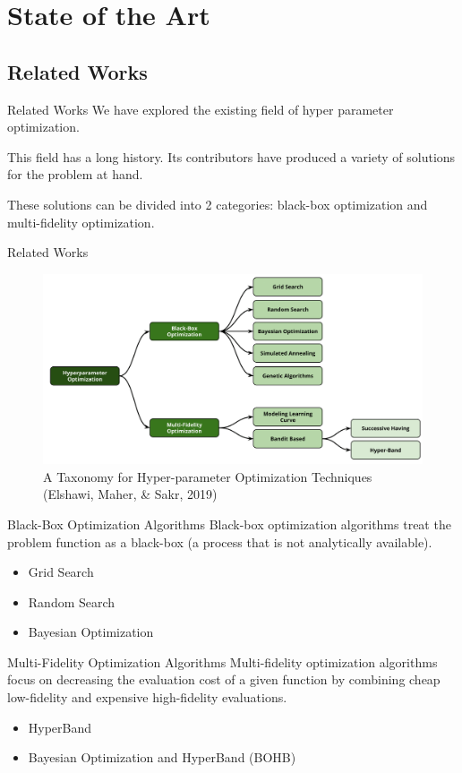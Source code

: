 \documentclass[10pt]{beamer}
\begin{document}
  \section{State of the Art}
  \subsection{Related Works}
  \begin{frame}{Related Works}
    We have explored the existing field of hyper parameter optimization. 

    This field has a long history. Its contributors have produced a variety of solutions for the problem at hand. 

    These solutions can be divided into 2 categories: black-box optimization and multi-fidelity optimization.
  \end{frame}
  \begin{frame}{Related Works}
    \begin{figure}
          \centering
          \includegraphics[width=\textwidth]{images/state_art-taxonomy_optimizers.png}
          \caption*{A Taxonomy for Hyper-parameter Optimization Techniques (Elshawi, Maher, \& Sakr, 2019)}
        \end{figure}
  \end{frame}
  \begin{frame}{Black-Box Optimization Algorithms}
    Black-box optimization algorithms treat the problem function as a black-box (a process that is not analytically available).
    \begin{itemize}
      \item{Grid Search}
      \item{Random Search}
      \item{Bayesian Optimization}
    \end{itemize}
  \end{frame}
  \begin{frame}{Multi-Fidelity Optimization Algorithms}
    Multi-fidelity optimization algorithms focus on decreasing the evaluation cost of a given function by combining cheap low-fidelity and expensive high-fidelity evaluations.
    \begin{itemize}
          \item{HyperBand}
          \item{Bayesian Optimization and HyperBand (BOHB)}
    \end{itemize}
  \end{frame}
\end{document}
